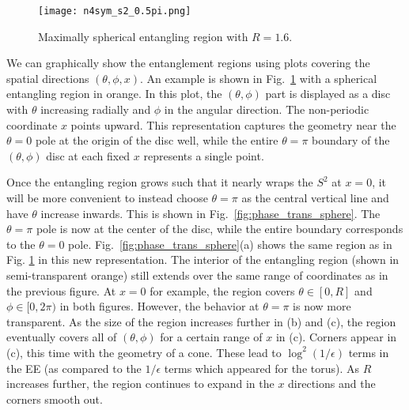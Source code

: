 \documentclass[11 pt]{article}
\begin{document}
\begin{figure}
    \centering
    \texttt{[image: n4sym\_s2\_0.5pi.png]}
    \caption{Maximally spherical entangling region with $R=1.6.$}
    \label{fig:sphere on sphere}
\end{figure}

We can graphically show the entanglement regions using plots covering the spatial directions $(\theta,\phi,x)$. An example is shown in Fig.~\ref{fig:sphere on sphere} with a spherical entangling region in orange. In this plot, the $(\theta,\phi)$ part is displayed as a disc with $\theta$ increasing radially and $\phi$ in the angular direction. The non-periodic coordinate $x$ points upward. This representation captures the geometry near the $\theta=0$ pole at the origin of the disc well, while the entire $\theta=\pi$ boundary of the $(\theta,\phi)$ disc at each fixed $x$ represents a single point.


Once the entangling region grows such that it nearly wraps the $S^2$ at $x=0$, it will be more convenient to instead choose $\theta=\pi$ as the central vertical line and have $\theta$ increase inwards. This is shown in Fig.~\ref{fig:phase_trans_sphere}. The $\theta=\pi$ pole is now at the center of the disc, while the entire boundary corresponds to the $\theta=0$ pole.
Fig.~\ref{fig:phase_trans_sphere}(a) shows the same region as in Fig. \ref{fig:sphere on sphere} in this new representation. The interior of the entangling region (shown in semi-transparent orange) still extends over the same range of coordinates as in the previous figure. At $x=0$ for example, the region covers $\theta\in[0,R]$ and $\phi\in[0,2\pi)$ in both figures. However, the behavior at $\theta=\pi$ is now more transparent. As the size of the region increases further in (b) and (c), the region eventually covers all of $(\theta,\phi)$ for a certain range of $x$ in (c). Corners appear in (c), this time with the geometry of a cone. These lead to $\log^2(1/\epsilon)$ terms in the EE \cite{Myers2012} (as compared to the $1/\epsilon$ terms which appeared for the torus). As $R$ increases further, the region continues to expand in the $x$ directions and the corners smooth out.
\end{document}
